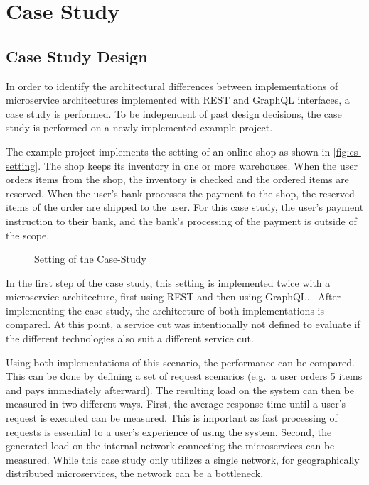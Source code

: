 \section{Case Study}\label{sec:case-study}

\subsection{Case Study Design}

In order to identify the architectural differences between implementations of microservice architectures implemented with REST and GraphQL interfaces, a case study is performed.
To be independent of past design decisions, the case study is performed on a newly implemented example project.

The example project implements the setting of an online shop as shown in \autoref{fig:cs-setting}.
The shop keeps its inventory in one or more warehouses.
When the user orders items from the shop, the inventory is checked and the ordered items are reserved.
When the user's bank processes the payment to the shop, the reserved items of the order are shipped to the user.
For this case study, the user's payment instruction to their bank, and the bank's processing of the payment is outside of the scope.

\begin{figure}[!htb]
    \centering
    
    \caption{Setting of the Case-Study}\label{fig:cs-setting}
\end{figure}

In the first step of the case study, this setting is implemented twice with a microservice architecture, first using \ac{REST} and then using GraphQL.~%
After implementing the case study, the architecture of both implementations is compared.
At this point, a service cut was intentionally not defined to evaluate if the different technologies also suit a different service cut.

Using both implementations of this scenario, the performance can be compared.
This can be done by defining a set of request scenarios (e.g.~a user orders 5 items and pays immediately afterward).
The resulting load on the system can then be measured in two different ways.
First, the average response time until a user's request is executed can be measured.
This is important as fast processing of requests is essential to a user's experience of using the system.
Second, the generated load on the internal network connecting the microservices can be measured.
While this case study only utilizes a single network, for geographically distributed microservices, the network can be a bottleneck.

